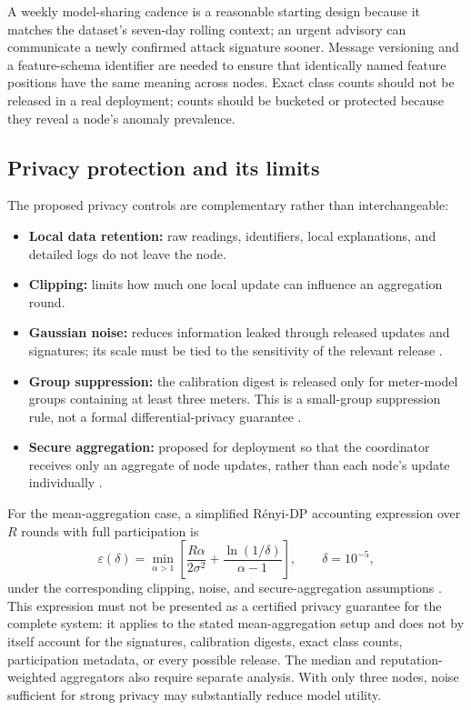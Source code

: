 A weekly model-sharing cadence is a reasonable starting design because it matches the dataset's seven-day rolling context; an urgent advisory can communicate a newly confirmed attack signature sooner. Message versioning and a feature-schema identifier are needed to ensure that identically named feature positions have the same meaning across nodes. Exact class counts should not be released in a real deployment; counts should be bucketed or protected because they reveal a node's anomaly prevalence.

\subsection{Privacy protection and its limits}
The proposed privacy controls are complementary rather than interchangeable:
\begin{itemize}
  \item \textbf{Local data retention:} raw readings, identifiers, local explanations, and detailed logs do not leave the node.
  \item \textbf{Clipping:} limits how much one local update can influence an aggregation round.
  \item \textbf{Gaussian noise:} reduces information leaked through released updates and signatures; its scale must be tied to the sensitivity of the relevant release \cite{dwork2014,abadi2016}.
  \item \textbf{Group suppression:} the calibration digest is released only for meter-model groups containing at least three meters. This is a small-group suppression rule, not a formal differential-privacy guarantee \cite{sweeney2002}.
  \item \textbf{Secure aggregation:} proposed for deployment so that the coordinator receives only an aggregate of node updates, rather than each node's update individually \cite{bonawitz2017}.
\end{itemize}

For the mean-aggregation case, a simplified Rényi-DP accounting expression over $R$ rounds with full participation is
\begin{equation}
 \varepsilon(\delta)=\min_{\alpha>1}\left[
 \frac{R\alpha}{2\sigma^2}+\frac{\ln(1/\delta)}{\alpha-1}
 \right],
 \qquad \delta=10^{-5},
 \label{eq:goal4-dp-accounting}
\end{equation}
under the corresponding clipping, noise, and secure-aggregation assumptions \cite{mironov2017}. This expression must not be presented as a certified privacy guarantee for the complete system: it applies to the stated mean-aggregation setup and does not by itself account for the signatures, calibration digests, exact class counts, participation metadata, or every possible release. The median and reputation-weighted aggregators also require separate analysis. With only three nodes, noise sufficient for strong privacy may substantially reduce model utility.


